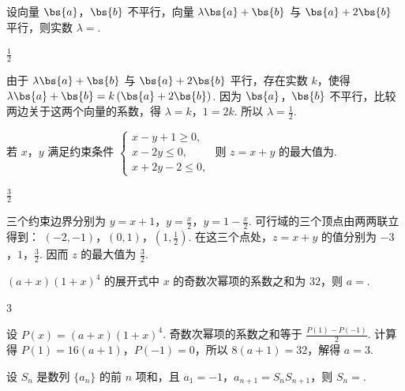 \begin{problem}
设向量 \(\bs{a}\)，\(\bs{b}\) 不平行，向量 \(\lambda\bs{a}+\bs{b}\) 与 \(\bs{a}+2\bs{b}\) 平行，则实数 \(\lambda=\)\fillinblank{}.
\end{problem}

\begin{answer}
\(\frac{1}{2}\)
\end{answer}

\begin{solution}
由于 \(\lambda\bs{a}+\bs{b}\) 与 \(\bs{a}+2\bs{b}\) 平行，存在实数 \(k\)，使得 \(\lambda\bs{a}+\bs{b}=k\left(\bs{a}+2\bs{b}\right)\). 因为 \(\bs{a}\)，\(\bs{b}\) 不平行，比较两边关于这两个向量的系数，得 \(\lambda=k\)，\(1=2k\). 所以 \(\lambda=\frac12\).
\end{solution}

\begin{problem}
若 \(x\)，\(y\) 满足约束条件 \(\begin{cases}
x-y+1\geqslant 0,\\
x-2y\leqslant 0,\\
x+2y-2\leqslant 0,
\end{cases}\) 则 \(z=x+y\) 的最大值为\fillinblank{}.
\end{problem}

\begin{answer}
\(\frac{3}{2}\)
\end{answer}

\begin{solution}
三个约束边界分别为 \(y=x+1\)，\(y=\frac{x}{2}\)，\(y=1-\frac{x}{2}\). 可行域的三个顶点由两两联立得到：
\((-2,-1)\)，\((0,1)\)，\(\left(1,\frac12\right)\).
在这三个点处，\(z=x+y\) 的值分别为 \(-3\)，\(1\)，\(\frac32\). 因而 \(z\) 的最大值为 \(\frac32\).
\end{solution}

\begin{problem}
\((a+x)(1+x)^4\) 的展开式中 \(x\) 的奇数次幂项的系数之和为 \(32\)，则 \(a=\)\fillinblank{}.
\end{problem}

\begin{answer}
3
\end{answer}

\begin{solution}
设 \(P(x)=(a+x)(1+x)^4\). 奇数次幂项的系数之和等于 \(\frac{P(1)-P(-1)}{2}\). 计算得 \(P(1)=16(a+1)\)，\(P(-1)=0\)，所以 \(8(a+1)=32\)，解得 \(a=3\).
\end{solution}

\begin{problem}
设 \(S_n\) 是数列 \(\{a_n\}\) 的前 \(n\) 项和，且 \(a_1=-1\)，\(a_{n+1}=S_nS_{n+1}\)，则 \(S_n=\)\fillinblank{}.
\end{problem}

